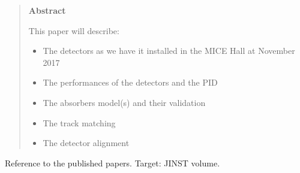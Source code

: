\begin{quotation}
\begin{center}
\textbf{Abstract}
\end{center}
  \noindent
  This paper will describe:
  \begin{itemize}
    \item The detectors as we have it installed in the MICE Hall at November 2017
    \item The performances of the detectors and the PID
    \item The absorbers model(s) and their validation
    \item The track matching
    \item The detector alignment
  \end{itemize}
\end{quotation}

\noindent

Reference to the published papers.
Target: JINST volume.
